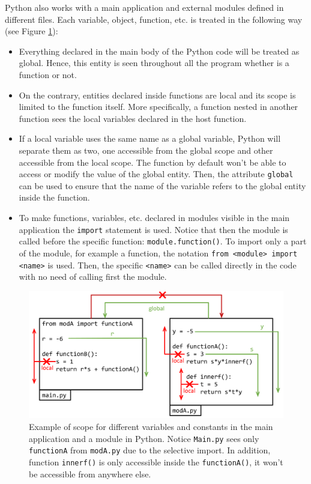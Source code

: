 Python also works with a main application and external modules defined in different files. 
Each variable, object, function, etc. is treated in the following way (see Figure \ref{fig:ScopePy}):
\begin{itemize}
    \item Everything declared in the main body of the Python code will be treated as global. 
    Hence, this entity is seen throughout all the program whether is a function or not.
    
    \item On the contrary, entities declared inside functions are local and its scope is limited to the function itself. 
    More specifically, a function nested in another function sees the local variables declared in the host function.
    
    \item If a local variable uses the same name as a global variable, Python will separate them as two, one accessible from the global scope and other accessible from the local scope. 
    The function by default won't be able to access or modify the value of the global entity.
    Then, the attribute \texttt{global} can be used to ensure that the name of the variable refers to the global entity inside the function.
    
    \item To make functions, variables, etc. declared in modules visible in the main application the \texttt{import} statement is used. 
    Notice that then the module is called before the specific function: \texttt{module.function()}.
    To import only a part of the module, for example a function, the notation \texttt{from <module> import <name>} is used. 
    Then, the specific \texttt{<name>} can be called directly in the code with no need of calling first the module.
\end{itemize}

\begin{figure}[h]
    \centering
    \includegraphics[width= \textwidth]{./doc/Figures/ScopePy.png}
    \caption{Example of scope for different variables and constants in the main application and a module in Python. Notice \texttt{Main.py} sees only \texttt{functionA} from \texttt{modA.py} due to the selective import. In addition, function \texttt{innerf()} is only accessible inside the \texttt{functionA()}, it won't be accessible from anywhere else.}
    \label{fig:ScopePy}
\end{figure}



